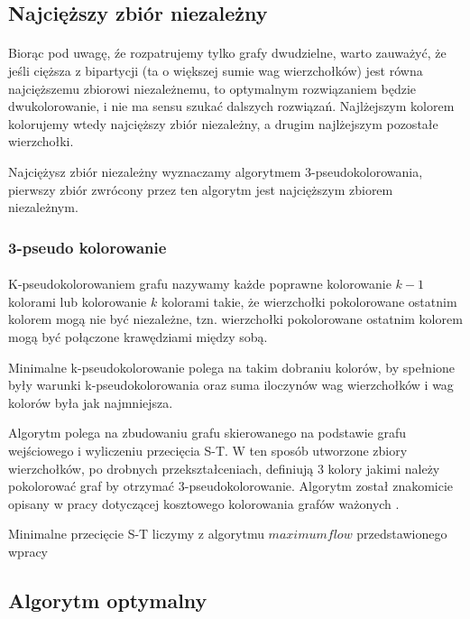 \documentclass{article}
\begin{document}
\subsection{Najcięższy zbiór niezależny}

\paragraph{} Biorąc pod uwagę, źe rozpatrujemy tylko grafy dwudzielne, warto zauważyć, że jeśli cięższa z bipartycji (ta o większej sumie wag wierzchołków) jest równa najcięższemu zbiorowi niezależnemu, to optymalnym rozwiązaniem będzie dwukolorowanie, i nie ma sensu szukać dalszych rozwiązań. Najlżejszym kolorem kolorujemy wtedy najcięższy zbiór niezależny, a drugim najlżejszym pozostałe wierzchołki.

Najciężysz zbiór niezależny wyznaczamy algorytmem 3-pseudokolorowania, pierwszy zbiór zwrócony przez ten algorytm jest najcięższym zbiorem niezależnym.

\subsubsection*{3-pseudo kolorowanie}

\paragraph{} K-pseudokolorowaniem grafu nazywamy każde poprawne kolorowanie $k-1$ kolorami lub kolorowanie $k$ kolorami takie, że wierzchołki pokolorowane ostatnim kolorem mogą nie być niezależne, tzn. wierzchołki pokolorowane ostatnim kolorem mogą być połączone krawędziami między sobą. 

Minimalne k-pseudokolorowanie polega na takim dobraniu kolorów, by spełnione były warunki k-pseudokolorowania oraz suma iloczynów wag wierzchołków i wag kolorów była jak najmniejsza.

Algorytm polega na zbudowaniu grafu skierowanego na podstawie grafu wejściowego i wyliczeniu przecięcia S-T. W ten sposób utworzone zbiory wierzchołków, po drobnych przekształceniach, definiują 3 kolory jakimi należy pokolorować graf by otrzymać 3-pseudokolorowanie. Algorytm został znakomicie opisany w pracy dotyczącej kosztowego kolorowania grafów ważonych \cite{kubale-pikies19}.

Minimalne przecięcie S-T liczymy z algorytmu $maximum flow$ przedstawionego wpracy

\subsection{Algorytm optymalny}
\end{document}
